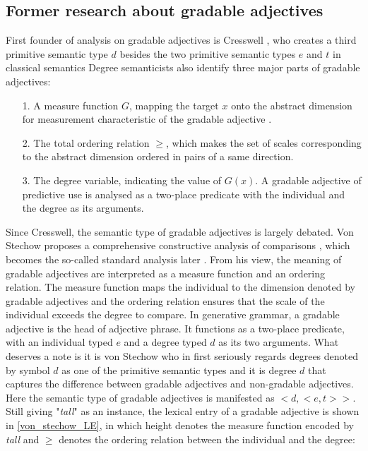 \documentclass{ctexart}
\let \cite \parencite
\begin{document}
\subsection{Former research about gradable adjectives}

First founder of analysis on gradable adjectives is Cresswell \cite{cresswell1976}, who creates a third primitive semantic type $d$ besides the two primitive semantic types $e$ and $t$ in classical semantics Degree semanticists also identify three major parts of gradable adjectives:

\begin{itemize}
    \item[1.] A measure function $G$, mapping the target $x$ onto the abstract dimension for measurement characteristic of the gradable adjective \cite{bartsch1974}.
    \item[2.] The total ordering relation $\geq$, which makes the set of scales corresponding to the abstract dimension ordered in pairs of a same direction.
    \item[3.] The degree variable, indicating the value of $G(x)$. A gradable adjective of predictive use is analysed as a two-place predicate with the individual and the degree as its arguments.
\end{itemize}

Since Cresswell, the semantic type of gradable adjectives is largely debated. Von Stechow proposes a comprehensive constructive analysis of comparisons \cite{von1984a}, which becomes the so-called standard analysis later \cite{bale2011}. From his view, the meaning of gradable adjectives are interpreted as a measure function and an ordering relation. The measure function maps the individual to the dimension denoted by gradable adjectives and the ordering relation ensures that the scale of the individual exceeds the degree to compare. In generative grammar, a gradable adjective is the head of adjective phrase. It functions as a two-place predicate, with an individual typed $e$ and a degree typed $d$ as its two arguments. What deserves a note is it is von Stechow who in first seriously regards degrees denoted by symbol $d$ as one of the primitive semantic types and it is degree $d$ that captures the difference between gradable adjectives and non-gradable adjectives. Here the semantic type of gradable adjectives is manifested as $<d,<e,t>>$. Still giving "\textit{tall}" as an instance, the lexical entry of a gradable adjective is shown in \ref{von_stechow_LE}, in which height denotes the measure function encoded by \textit{tall} and $\geq$ denotes the ordering relation between the individual and the degree:
\end{document}
